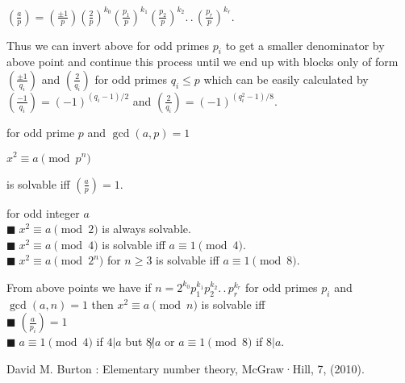 \documentclass[11pt]{extarticle}
\newcommand{\ck}{.\,.\,}
\newcommand{\tbx}[2][]{
\begin{tcolorbox}[enhanced,breakable,size=small,colback=black!2!white,title={#1},arc is angular, arc=1.5mm,
	drop fuzzy shadow]
	#2
\end{tcolorbox}
}
\newcommand{\y}{$\blacksquare\;$}
\begin{document}
\begin{multicols}{2}
{\begin{center}
 $ (\frac{ a }{p})=(\frac{ \pm1 }{p} ) (\frac{ 2 }{p})^{k_0}(\frac{ p_1 }{p})^{k_1}(\frac{ p_2 }{p})^{k_2}\ck( \frac{ p_r }{p})^{k_r} . $ 
 \end{center}
 
Thus we can invert above for odd primes $ p_i $ to get a smaller denominator by above point and continue this process until we end up with blocks only of form $ (\frac{ \pm 1 }{q_i}) $ and $ (\frac{ 2 }{q_i}) $ for odd primes $ q_i\leq p $ which can be easily calculated by $ (\frac{ -1 }{q_i} )=(-1)^{(q_i-1)/2} $ and $ (\frac{ 2 }{q_i} )=(-1)^{(q_i^2-1)/8} $.}
\tbx{ for odd prime $ p $ and $ \gcd(a,p)=1 $ 
\begin{center}
 $  x^2\equiv a\pmod{p^n} $ 
 \end{center}
 is solvable iff $ (\frac{ a }{p})=1. $}
\tbx{ for odd integer $ a $ \\
\y $ x^2\equiv a\pmod{2} $ is always solvable.\\
\y $ x^2\equiv a\pmod{4} $ is solvable iff $ a\equiv 1\pmod{4} $.\\
\y $ x^2\equiv a\pmod{2^n} $ for $ n\geq 3 $ is solvable iff $ a\equiv 1\pmod{8} $. }
\tbx{ From above points we have if $ n=  2^{k_0}p_1^{k_1}p_2^{k_2}\ck p_r^{k_r} $ for odd primes $ p_i $ and $ \gcd(a,n) =1$ then $ x^2\equiv a\pmod{n} $ is solvable iff\\
	\y $ (\frac{ a }{p_i})=1 $ \\
	\y $ a\equiv1\pmod{4} $ if $ 4|a $ but $ 8\not|a $  or $ a\equiv1\pmod{8} $ if $ 8|a $.}
	\newcolumn
	\begin{thebibliography}{9}
		David M. Burton : Elementary number theory, McGraw·Hill, 7, (2010).
	\end{thebibliography}
\end{multicols}
\end{document}

